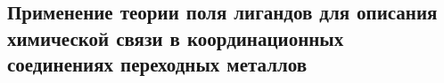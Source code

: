 \subsection{Применение теории поля лигандов для описания химической связи в координационных соединениях переходных металлов}


